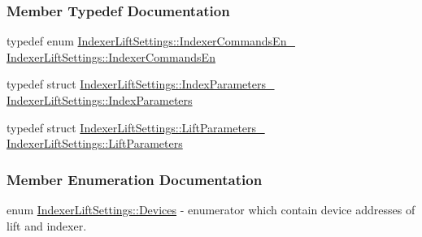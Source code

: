 \subsubsection{Member Typedef Documentation}
\mbox{\label{classIndexerLiftSettings_ad0959473f792741cadaa262730f5a463}} 
{\footnotesize\ttfamily typedef enum \mbox{\hyperlink{classIndexerLiftSettings_a1cdeb18e15c35f26a2979194c6db9452}{Indexer\+Lift\+Settings\+::\+Indexer\+Commands\+En\+\_\+}} \mbox{\hyperlink{classIndexerLiftSettings_ad0959473f792741cadaa262730f5a463}{Indexer\+Lift\+Settings\+::\texorpdfstring{Indexer\+Commands\+En}{IndexerCommandsEn}}}}

\mbox{\label{classIndexerLiftSettings_a6b75f15b6abc72b9070642cb8b5408ca}} 
{\footnotesize\ttfamily typedef struct \mbox{\hyperlink{structIndexerLiftSettings_1_1IndexParameters__}{Indexer\+Lift\+Settings\+::\+Index\+Parameters\+\_\+}} \mbox{\hyperlink{classIndexerLiftSettings_a6b75f15b6abc72b9070642cb8b5408ca}{Indexer\+Lift\+Settings\+::\texorpdfstring{Index\+Parameters}{IndexParameters}}}}

\mbox{\label{classIndexerLiftSettings_a83fd6fc58021bc526b681c1ce840f686}} 
{\footnotesize\ttfamily typedef struct \mbox{\hyperlink{structIndexerLiftSettings_1_1LiftParameters__}{Indexer\+Lift\+Settings\+::\+Lift\+Parameters\+\_\+}} \mbox{\hyperlink{classIndexerLiftSettings_a83fd6fc58021bc526b681c1ce840f686}{Indexer\+Lift\+Settings\+::\texorpdfstring{Lift\+Parameters}{LiftParameters}}}}



\subsubsection{Member Enumeration Documentation}
\mbox{\label{classIndexerLiftSettings_a3ab6e8bfdd1aaed688b1cca43dd7c913}} 
{\footnotesize\ttfamily enum \mbox{\hyperlink{classIndexerLiftSettings_a3ab6e8bfdd1aaed688b1cca43dd7c913}{Indexer\+Lift\+Settings\+::\texorpdfstring{Devices}{Devices}}}} - enumerator which contain device addresses of lift and indexer. 

